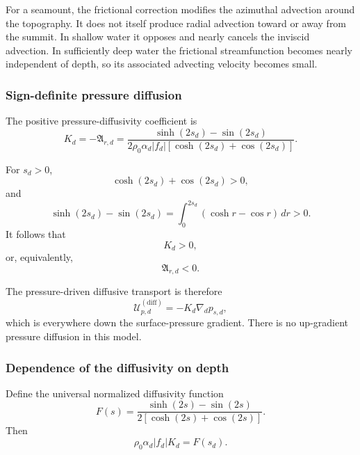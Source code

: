 \documentclass[10pt]{amsart}
\begin{document}
For a seamount, the frictional correction modifies the azimuthal
advection around the topography. It does not itself produce radial
advection toward or away from the summit. In shallow water it opposes
and nearly cancels the inviscid advection. In sufficiently deep water
the frictional streamfunction becomes nearly independent of depth,
so its associated advecting velocity becomes small.


\subsubsection{Sign-definite pressure diffusion}

The positive pressure-diffusivity coefficient is
\begin{equation}
\boxed{
K_d
=
-\mathfrak A_{r,d}
=
\frac{
\sinh(2s_d)-\sin(2s_d)
}{
2\rho_0\alpha_d|f_d|
\left[
\cosh(2s_d)+\cos(2s_d)
\right]
}
}.
\end{equation}

For \(s_d>0\),
\begin{equation}
\cosh(2s_d)+\cos(2s_d)>0,
\end{equation}
and
\begin{equation}
\sinh(2s_d)-\sin(2s_d)
=
\int_0^{2s_d}
\left(
\cosh r-\cos r
\right)\,dr
>0.
\end{equation}
It follows that
\begin{equation}
\boxed{K_d>0},
\end{equation}
or, equivalently,
\begin{equation}
\boxed{\mathfrak A_{r,d}<0}.
\end{equation}

The pressure-driven diffusive transport is therefore
\begin{equation}
\boxed{
\boldsymbol{\mathcal U}_{p,d}^{(\mathrm{diff})}
=
-K_d\nabla_d p_{s,d}
},
\end{equation}
which is everywhere down the surface-pressure gradient. There is no
up-gradient pressure diffusion in this model.


\subsubsection{Dependence of the diffusivity on depth}

Define the universal normalized diffusivity function
\begin{equation}
F(s)
=
\frac{
\sinh(2s)-\sin(2s)
}{
2\left[
\cosh(2s)+\cos(2s)
\right]
}.
\end{equation}
Then
\begin{equation}
\rho_0\alpha_d|f_d|K_d
=
F(s_d).
\end{equation}
\end{document}
